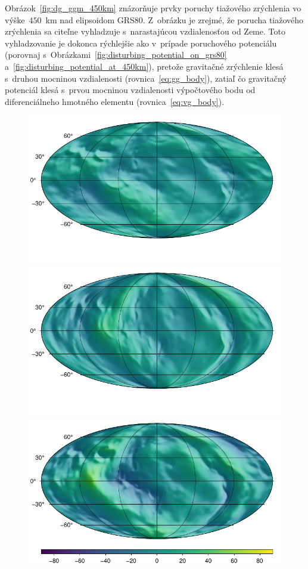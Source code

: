 \documentclass[a4paper, 12pt]{book}
\begin{document}
Obrázok~\ref{fig:dg_ggm_450km} znázorňuje prvky poruchy tiažového zrýchlenia vo 
výške~$450$~km nad elipsoidom GRS80.  Z~obrázku je zrejmé, že porucha tiažového 
zrýchlenia sa citeľne vyhladzuje s~narastajúcou vzdialenosťou od Zeme.  Toto 
vyhladzovanie je dokonca rýchlejšie ako v~prípade poruchového potenciálu 
(porovnaj s~Obrázkami~\ref{fig:disturbing_potential_on_grs80} 
a~\ref{fig:disturbing_potential_at_450km}), pretože gravitačné zrýchlenie klesá 
s~druhou mocninou vzdialenosti (rovnica~\ref{eq:gg_body}), zatiaľ čo gravitačný 
potenciál klesá s~prvou mocninou vzdialenosti výpočtového bodu od 
diferenciálneho hmotného elementu (rovnica~\ref{eq:vg_body}).

\begin{figure}
\centering
\includegraphics{./fig-gravity-disturbance-at-450km-x.pdf}
\includegraphics{./fig-gravity-disturbance-at-450km-y.pdf}
\includegraphics{./fig-gravity-disturbance-at-450km-z.pdf}

\end{figure}
\end{document}
